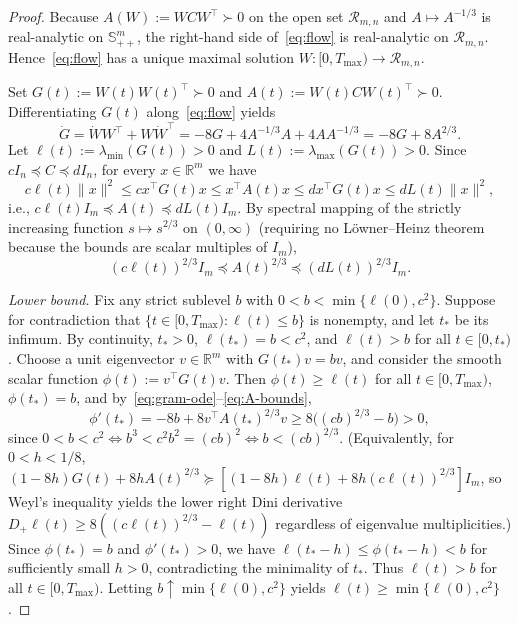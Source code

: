 \documentclass[11pt]{article}
\theoremstyle{plain}
\theoremstyle{definition}
\theoremstyle{remark}
\begin{document}
\begin{proof}
Because $A(W) := WCW^\top \succ 0$ on the open set $\mathcal{R}_{m,n}$ and $A \mapsto A^{-1/3}$ is real-analytic on $\mathbb{S}^m_{++}$, the right-hand side of~\eqref{eq:flow} is real-analytic on $\mathcal{R}_{m,n}$. Hence~\eqref{eq:flow} has a unique maximal solution $W : [0, T_{\max}) \to \mathcal{R}_{m,n}$.

Set $G(t) := W(t)W(t)^\top \succ 0$ and $A(t) := W(t)CW(t)^\top \succ 0$. Differentiating $G(t)$ along~\eqref{eq:flow} yields
\begin{equation}\label{eq:gram-ode}
\dot{G} = \dot{W}W^\top + W\dot{W}^\top = -8G + 4A^{-1/3}A + 4AA^{-1/3} = -8G + 8A^{2/3}.
\end{equation}
Let $\ell(t) := \lambda_{\min}(G(t)) > 0$ and $L(t) := \lambda_{\max}(G(t)) > 0$. Since $cI_n \preceq C \preceq dI_n$, for every $x \in \mathbb{R}^m$ we have
\[
c\ell(t)\|x\|^2 \le c x^\top G(t) x \le x^\top A(t) x \le d x^\top G(t) x \le dL(t)\|x\|^2,
\]
i.e., $c\ell(t) I_m \preceq A(t) \preceq dL(t) I_m$. By spectral mapping of the strictly increasing function $s \mapsto s^{2/3}$ on $(0, \infty)$ (requiring no L\"owner--Heinz theorem because the bounds are scalar multiples of $I_m$),
\begin{equation}\label{eq:A-bounds}
(c\ell(t))^{2/3} I_m \preceq A(t)^{2/3} \preceq (dL(t))^{2/3} I_m.
\end{equation}

\emph{Lower bound.} Fix any strict sublevel $b$ with $0 < b < \min\{\ell(0), c^2\}$. Suppose for contradiction that $\{t \in [0, T_{\max}) : \ell(t) \le b\}$ is nonempty, and let $t_*$ be its infimum. By continuity, $t_* > 0$, $\ell(t_*) = b < c^2$, and $\ell(t) > b$ for all $t \in [0, t_*)$. Choose a unit eigenvector $v \in \mathbb{R}^m$ with $G(t_*)v = bv$, and consider the smooth scalar function $\phi(t) := v^\top G(t) v$. Then $\phi(t) \ge \ell(t)$ for all $t \in [0, T_{\max})$, $\phi(t_*) = b$, and by~\eqref{eq:gram-ode}--\eqref{eq:A-bounds},
\[
\phi'(t_*) = -8b + 8v^\top A(t_*)^{2/3} v \ge 8\bigl((cb)^{2/3} - b\bigr) > 0,
\]
since $0 < b < c^2 \iff b^3 < c^2 b^2 = (cb)^2 \iff b < (cb)^{2/3}$. (Equivalently, for $0 < h < 1/8$, $(1 - 8h)G(t) + 8hA(t)^{2/3} \succeq [(1-8h)\ell(t) + 8h(c\ell(t))^{2/3}]I_m$, so Weyl's inequality yields the lower right Dini derivative $D_+ \ell(t) \ge 8((c\ell(t))^{2/3} - \ell(t))$ regardless of eigenvalue multiplicities.) Since $\phi(t_*) = b$ and $\phi'(t_*) > 0$, we have $\ell(t_* - h) \le \phi(t_* - h) < b$ for sufficiently small $h > 0$, contradicting the minimality of $t_*$. Thus $\ell(t) > b$ for all $t \in [0, T_{\max})$. Letting $b \uparrow \min\{\ell(0), c^2\}$ yields $\ell(t) \ge \min\{\ell(0), c^2\}$.


\end{proof}
\end{document}

